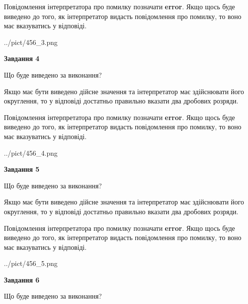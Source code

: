 \documentclass[12pt, ukrainian]{article}
\begin{document}
{\begin {Large}
Повідомлення інтерпретатора про помилку позначати \textbf{error}.
Якщо щось буде виведено до того, як інтерпретатор видасть повідомлення про помилку, 
то воно має вказуватись у відповіді. \par

\begin{center}
	{../pict/456_3.png}
\end{center}
\newpage

{\begin {center}\textbf{Завдання 4}\end {center}}\par
Що буде виведено за виконання? \par

Якщо має бути виведено дійсне значення та інтерпретатор має здійснювати його округлення, 
то у відповіді достатньо правильно вказати два дробових розряди.

Повідомлення інтерпретатора про помилку позначати \textbf{error}.
Якщо щось буде виведено до того, як інтерпретатор видасть повідомлення про помилку, 
то воно має вказуватись у відповіді. \par

\begin{center}
	{../pict/456_4.png}
\end{center}
\newpage

{\begin {center}\textbf{Завдання 5}\end {center}}\par
Що буде виведено за виконання? \par

Якщо має бути виведено дійсне значення та інтерпретатор має здійснювати його округлення, 
то у відповіді достатньо правильно вказати два дробових розряди.

Повідомлення інтерпретатора про помилку позначати \textbf{error}.
Якщо щось буде виведено до того, як інтерпретатор видасть повідомлення про помилку, 
то воно має вказуватись у відповіді. \par

\begin{center}
	{../pict/456_5.png}
\end{center}
\newpage

{\begin {center}\textbf{Завдання 6}\end {center}}\par
Що буде виведено за виконання? \par


\end{Large}}
\end{document}
